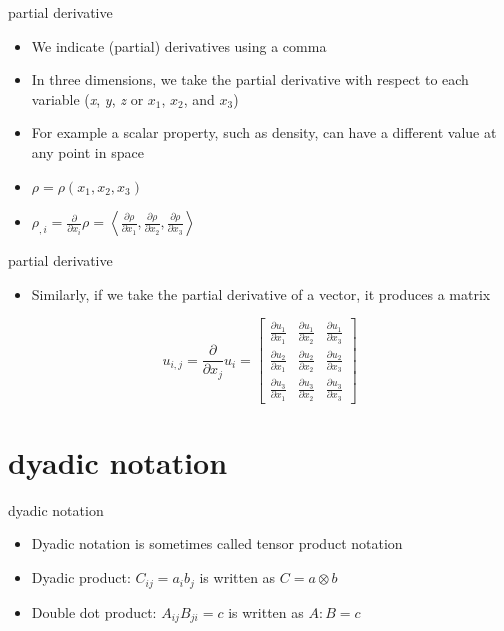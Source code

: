 \documentclass[
  letterpaper,
  ignorenonframetext,
  aspectratio=43,
  handout,
  12pt]{beamer}
\providecommand{\tightlist}{%
  \setlength{\itemsep}{0pt}\setlength{\parskip}{0pt}}
\providecommand{\tightlist}{%
\setlength{\itemsep}{0pt}\setlength{\parskip}{0pt}}
\begin{document}
\begin{frame}{partial derivative}
\protect\hypertarget{partial-derivative}{}
\begin{itemize}
\tightlist
\item
  We indicate (partial) derivatives using a comma
\item
  In three dimensions, we take the partial derivative with respect to
  each variable (\emph{x}, \emph{y}, \emph{z} or \(x_1\), \(x_2\), and
  \(x_3\))
\item
  For example a scalar property, such as density, can have a different
  value at any point in space
\item
  \(\rho = \rho(x_1, x_2, x_3)\)
\item
  \(\rho_{,i} = \frac{\partial}{\partial x_i} \rho = \left \langle \frac{\partial \rho }{\partial x_1}, \frac{\partial \rho }{\partial x_2}, \frac{\partial \rho }{\partial x_3} \right\rangle\)
\end{itemize}
\end{frame}

\begin{frame}{partial derivative}
\protect\hypertarget{partial-derivative-1}{}
\begin{itemize}
\tightlist
\item
  Similarly, if we take the partial derivative of a vector, it produces
  a matrix
\end{itemize}

\[u_{i,j} = \frac{\partial}{\partial x_j} u_i = \begin{bmatrix}
  \frac{\partial u_1}{\partial x_1} & \frac{\partial u_1}{\partial x_2} & \frac{\partial u_1}{\partial x_3}\\
  \frac{\partial u_2}{\partial x_1} & \frac{\partial u_2}{\partial x_2} & \frac{\partial u_2}{\partial x_3}\\
  \frac{\partial u_3}{\partial x_1} & \frac{\partial u_3}{\partial x_2} & \frac{\partial u_3}{\partial x_3}
\end{bmatrix}\]
\end{frame}

\hypertarget{dyadic-notation}{%
\section{dyadic notation}\label{dyadic-notation}}

\begin{frame}{dyadic notation}
\protect\hypertarget{dyadic-notation-1}{}
\begin{itemize}
\tightlist
\item
  Dyadic notation is sometimes called tensor product notation
\item
  Dyadic product: \(C_{ij} = a_i b_j\) is written as \(C = a \otimes b\)
\item
  Double dot product: \(A_{ij} B_{ji} = c\) is written as \(A : B = c\)
\end{itemize}
\end{frame}
\end{document}
